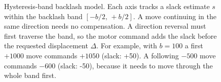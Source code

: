 \begin{figure}[H]
    \centering
    \caption[Hysteresis-band backlash model]{Hysteresis-band backlash model. Each axis tracks a slack estimate $s$ within the backlash
    band $[-b/2,\,+b/2]$. A move continuing in the same direction needs no compensation. A direction
    reversal must first traverse the band, so the motor command adds the slack before the
    requested displacement $\Delta$. For example, with $b=100$ a first $+1000$ move commands $+1050$
    (slack: +50). A following $-500$ move commands $-600$ (slack: -50), because it needs to move through the whole band first.}
    \label{fig:backlash-band}
\end{figure}
